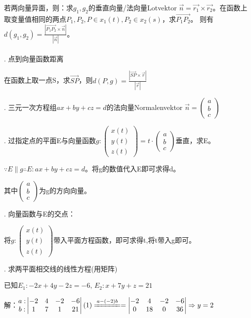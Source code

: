\documentclass[fleqn]{article}
\begin{document}
若两向量异面，则：求$g_1,g_2$的垂直向量/法向量Lotvektor $\vec{n}=\vec{r_1}\times\vec{r_2}$。在函数上取变量值相同的两点$P_1,P_2,P\in x_1(t),P_2\in x_2(s)$，求$\overrightarrow{P_1P_2}$。
则有$d(g_1,g_2)=\frac{|\overrightarrow{P_1P_2}\times\vec{n}|}{|\vec{n}|}$。
\\
\\
. 点到向量函数距离 

在函数上取一点S，求$\overrightarrow{SP}$，则$d(P,g)=\frac{|\overrightarrow{SP}\times\vec{r}|}{|\vec{r}|}$

. 三元一次方程组$ax+by+cz=d$的法向量Normalenvektor $\vec{n} = \begin{pmatrix}
    a\\b\\c
\end{pmatrix}$

. 过指定点的平面E与向量函数$g: \begin{pmatrix}
    x(t)\\y(t)\\z(t)
\end{pmatrix}=t\cdot\begin{pmatrix}
    a\\b\\c
\end{pmatrix}$垂直，求E。

$\because E\parallel g \therefore E: ax+by+cz=d$。将g的数值代入E即可求得d。

其中$\begin{pmatrix}
    a\\b\\c
\end{pmatrix}$为g的方向向量。

. 向量函数与E的交点：

将$g: \begin{pmatrix}
    x(t)\\y(t)\\z(t)
\end{pmatrix}$带入平面方程函数，即可求得t,将t带入g即可。

. 求两平面相交线的线性方程(用矩阵)

已知$E_1: -2x+4y-2z=-6,\,E_2: x+7y+z=21$

解：$\begin{matrix}
    a:\\b:
\end{matrix}\begin{vmatrix}
    -2&4&-2&-6\\1&7&1&21
\end{vmatrix}(1)\xlongequal[]{a-(-2)b}=\begin{vmatrix}
    -2&4&-2&-6\\0&18&0&36
\end{vmatrix}\Rightarrow y=2$
\end{document}
